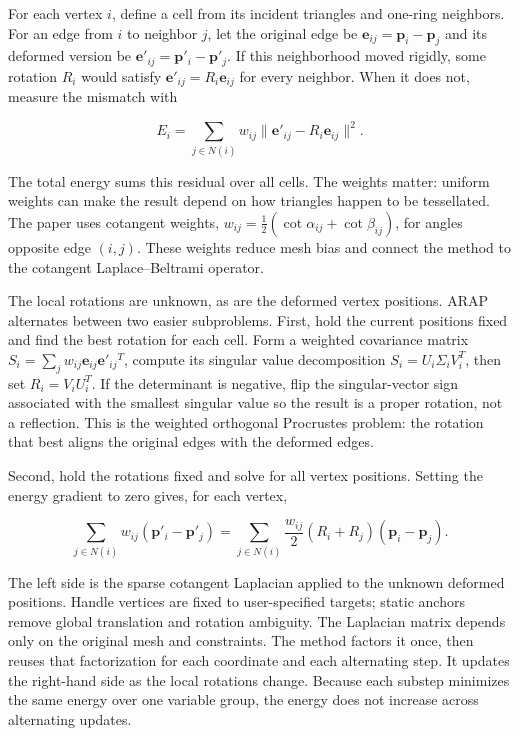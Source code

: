 For each vertex \(i\), define a cell from its incident triangles and one-ring neighbors. For an edge from \(i\) to neighbor \(j\), let the original edge be \(\mathbf{e}_{ij}=\mathbf{p}_i-\mathbf{p}_j\) and its deformed version be \(\mathbf{e}'_{ij}=\mathbf{p}'_i-\mathbf{p}'_j\). If this neighborhood moved rigidly, some rotation \(R_i\) would satisfy \(\mathbf{e}'_{ij}=R_i\mathbf{e}_{ij}\) for every neighbor. When it does not, measure the mismatch with

\[E_i=\sum_{j\in N(i)}w_{ij}\|\mathbf{e}'_{ij}-R_i\mathbf{e}_{ij}\|^2.\]

The total energy sums this residual over all cells. The weights matter: uniform weights can make the result depend on how triangles happen to be tessellated. The paper uses cotangent weights, \(w_{ij}=\tfrac12(\cot\alpha_{ij}+\cot\beta_{ij})\), for angles opposite edge \((i,j)\). These weights reduce mesh bias and connect the method to the cotangent Laplace--Beltrami operator.

The local rotations are unknown, as are the deformed vertex positions. ARAP alternates between two easier subproblems. First, hold the current positions fixed and find the best rotation for each cell. Form a weighted covariance matrix \(S_i=\sum_jw_{ij}\mathbf{e}_{ij}\mathbf{e}'_{ij}{}^T\), compute its singular value decomposition \(S_i=U_i\Sigma_iV_i^T\), then set \(R_i=V_iU_i^T\). If the determinant is negative, flip the singular-vector sign associated with the smallest singular value so the result is a proper rotation, not a reflection. This is the weighted orthogonal Procrustes problem: the rotation that best aligns the original edges with the deformed edges.

Second, hold the rotations fixed and solve for all vertex positions. Setting the energy gradient to zero gives, for each vertex,

\[\sum_{j\in N(i)}w_{ij}(\mathbf{p}'_i-\mathbf{p}'_j)=\sum_{j\in N(i)}\frac{w_{ij}}{2}(R_i+R_j)(\mathbf{p}_i-\mathbf{p}_j).\]

The left side is the sparse cotangent Laplacian applied to the unknown deformed positions. Handle vertices are fixed to user-specified targets; static anchors remove global translation and rotation ambiguity. The Laplacian matrix depends only on the original mesh and constraints. The method factors it once, then reuses that factorization for each coordinate and each alternating step. It updates the right-hand side as the local rotations change. Because each substep minimizes the same energy over one variable group, the energy does not increase across alternating updates.

